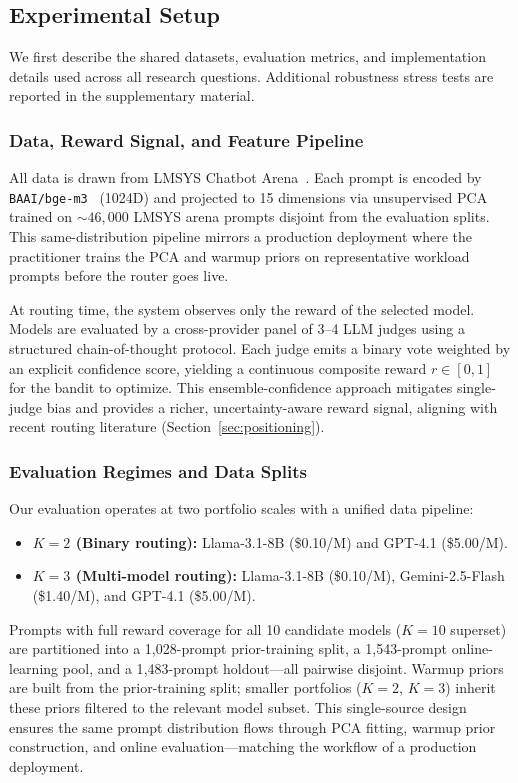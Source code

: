 \subsection{Experimental Setup}
\label{sec:experiments}

We first describe the shared datasets, evaluation metrics, and implementation details used across all research questions. Additional robustness stress tests are reported in the supplementary material.

\subsubsection{Data, Reward Signal, and Feature Pipeline}
\label{sec:data}
All data is drawn from LMSYS Chatbot Arena~\cite{zheng2023judging}.
Each prompt is encoded by \texttt{BAAI/bge-m3}~\cite{chen2024bge} (1024D) and projected to 15 dimensions via unsupervised PCA trained on ${\sim}46{,}000$ LMSYS arena prompts disjoint from the evaluation splits.
This same-distribution pipeline mirrors a production deployment where the practitioner trains the PCA and warmup priors on representative workload prompts before the router goes live.

At routing time, the system observes only the reward of the selected model.
Models are evaluated by a cross-provider panel of 3--4 LLM judges using a structured chain-of-thought protocol. Each judge emits a binary vote weighted by an explicit confidence score, yielding a continuous composite reward $r \in [0, 1]$ for the bandit to optimize. This ensemble-confidence approach mitigates single-judge bias and provides a richer, uncertainty-aware reward signal, aligning with recent routing literature (Section~\ref{sec:positioning}).

\subsubsection{Evaluation Regimes and Data Splits}
Our evaluation operates at two portfolio scales with a unified data pipeline:
\begin{itemize}[nosep,leftmargin=*]
    \item \textbf{$K{=}2$ (Binary routing):} Llama-3.1-8B (\$0.10/M) and GPT-4.1 (\$5.00/M).
    \item \textbf{$K{=}3$ (Multi-model routing):} Llama-3.1-8B (\$0.10/M), Gemini-2.5-Flash (\$1.40/M), and GPT-4.1 (\$5.00/M).
\end{itemize}
Prompts with full reward coverage for all 10 candidate models ($K{=}10$ superset) are partitioned into a 1{,}028-prompt prior-training split, a 1{,}543-prompt online-learning pool, and a 1{,}483-prompt holdout---all pairwise disjoint.
Warmup priors are built from the prior-training split; smaller portfolios ($K{=}2$, $K{=}3$) inherit these priors filtered to the relevant model subset.
This single-source design ensures the same prompt distribution flows through PCA fitting, warmup prior construction, and online evaluation---matching the workflow of a production deployment.

